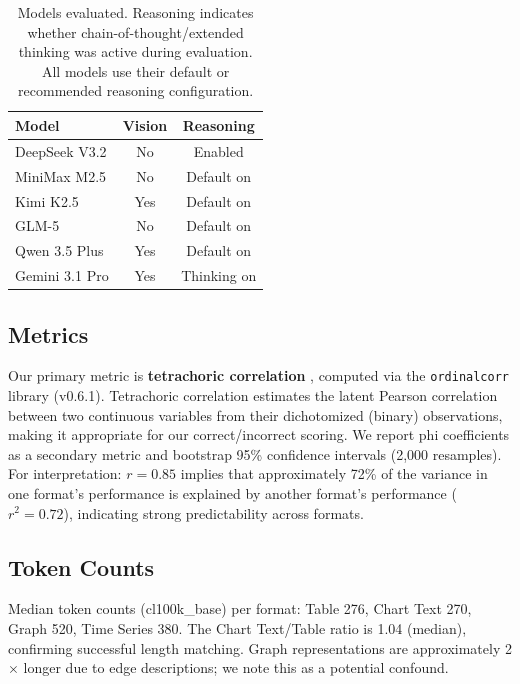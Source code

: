 \documentclass[11pt]{article}
\begin{document}
\begin{table}[t]
\centering
\small
\begin{tabular}{lcc}
\toprule
\textbf{Model} & \textbf{Vision} & \textbf{Reasoning} \\
\midrule
DeepSeek V3.2 & No & Enabled \\
MiniMax M2.5 & No & Default on \\
Kimi K2.5 & Yes & Default on \\
GLM-5 & No & Default on \\
Qwen 3.5 Plus & Yes & Default on \\
Gemini 3.1 Pro & Yes & Thinking on \\
\bottomrule
\end{tabular}
\caption{Models evaluated. Reasoning indicates whether chain-of-thought/extended thinking was active during evaluation. All models use their default or recommended reasoning configuration.}
\label{tab:models}
\end{table}

\subsection{Metrics}

Our primary metric is \textbf{tetrachoric correlation} \cite{divgi1979calculation}, computed via the \texttt{ordinalcorr} library (v0.6.1). Tetrachoric correlation estimates the latent Pearson correlation between two continuous variables from their dichotomized (binary) observations, making it appropriate for our correct/incorrect scoring. We report phi coefficients as a secondary metric and bootstrap 95\% confidence intervals (2,000 resamples). For interpretation: $r{=}0.85$ implies that approximately 72\% of the variance in one format's performance is explained by another format's performance ($r^2{=}0.72$), indicating strong predictability across formats.

\subsection{Token Counts}

Median token counts (cl100k\_base) per format: Table 276, Chart Text 270, Graph 520, Time Series 380. The Chart Text/Table ratio is 1.04 (median), confirming successful length matching. Graph representations are approximately 2$\times$ longer due to edge descriptions; we note this as a potential confound.

\end{document}
